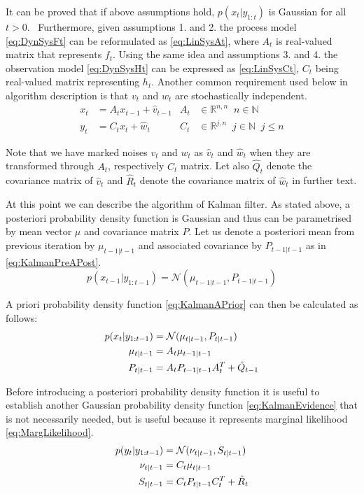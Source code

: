 \documentclass[a4paper,12pt,oneside]{report}
\newcommand{\pdf}{probability density function}
\begin{document}
It can be proved that if above assumptions hold, \(p(x_t|y_{1:t})\) is Gaussian for all
\(t > 0\).~\cite{Pet:81} Furthermore, given assumptions 1. and 2. the process model
\eqref{eq:DynSysFt} can be reformulated as \eqref{eq:LinSysAt}, where \(A_t\) is real-valued matrix
that represents \(f_t\).
Using the same idea and assumptions 3. and 4. the observation model \eqref{eq:DynSysHt} can be
expressed as \eqref{eq:LinSysCt}, \(C_t\) being real-valued matrix representing \(h_t\). Another
common requirement used below in algorithm description is that \(v_t\) and \(w_t\) are
stochastically independent.
\begin{align}
	x_t &= A_t x_{t-1} + \hat{v}_{t-1} & A_t &\in \mathbb{R}^{n,n} \;\; n \in \mathbb{N} \label{eq:LinSysAt} \\
	y_t &= C_t x_t + \hat{w}_t & C_t &\in \mathbb{R}^{j,n} \;\; j \in \mathbb{N} \;\; j \leq n \label{eq:LinSysCt}
\end{align}

Note that we have marked noises \(v_t\) and \(w_t\) as \(\hat{v}_t\) and \(\hat{w}_t\) when they
are transformed through \(A_t\), respectively \(C_t\) matrix. Let also \(\hat{Q}_t\) denote the
covariance matrix of \(\hat{v}_t\) and \(\hat{R}_t\) denote the covariance matrix of \(\hat{w}_t\)
in further text.

At this point we can describe the algorithm of Kalman filter. As stated above, a posteriori {\pdf}
is Gaussian and thus can be parametrised by mean vector \(\mu\) and covariance matrix \(P\). Let us
denote a posteriori mean from previous iteration by \(\mu_{t-1|t-1}\) and associated covariance by
\(P_{t-1|t-1}\) as in \eqref{eq:KalmanPreAPost}.
\begin{equation} \label{eq:KalmanPreAPost}
	p(x_{t-1} | y_{1:t-1}) = \mathcal{N}(\mu_{t-1|t-1}, P_{t-1|t-1})
\end{equation}

A priori {\pdf} \eqref{eq:KalmanAPrior} can then be calculated as follows:~\cite{AruMasGor:02}
\begin{align}
	p(x_t | y_{1:t-1}) &= \mathcal{N}(\mu_{t|t-1}, P_{t|t-1}) \label{eq:KalmanAPrior} \\
	\mu_{t|t-1} &= A_t \mu_{t-1|t-1} \notag \\
	P_{t|t-1} &= A_t P_{t-1|t-1} A_t^T + \hat{Q}_{t-1} \notag
\end{align}

Before introducing a posteriori {\pdf} it is useful to establish another Gaussian {\pdf}
\eqref{eq:KalmanEvidence} that is not necessarily needed, but is useful because it represents
marginal likelihood \eqref{eq:MargLikelihood}. %
\begin{align}
	p(y_t|y_{1:t-1}) &= \mathcal{N}(\nu_{t|t-1}, S_{t|t-1}) \label{eq:KalmanEvidence} \\
	\nu_{t|t-1} &= C_t \mu_{t|t-1} \notag \\
	S_{t|t-1} &= C_t P_{t|t-1} C_t^T + \hat{R}_t \notag
\end{align}
\end{document}
